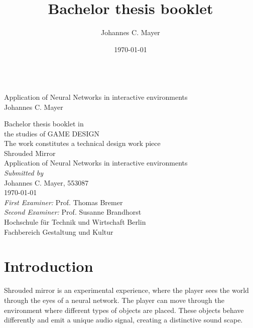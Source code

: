 \documentclass[a4paper, twoside, 10pt]{report}
\title{Bachelor thesis booklet}
\author{Johannes C. Mayer}
\date{\today}
\newcommand\blankpage{\null\thispagestyle{empty}\addtocounter{page}{-1}\newpage}
\begin{document}
\begin{titlepage}
\vfill
\noindent
{\color{white}{\Huge Shrouded Mirror} \\
{\Large Application of Neural Networks in interactive environments \\
Johannes C. Mayer}}
\vfill

\pagecolor{black}
\afterpage{\nopagecolor}
\end{titlepage}

\blankpage
\pagestyle{plain}

\begin{center}
\begin{spacing}{1.5}
{\Large
Bachelor thesis booklet in \\ the studies of GAME DESIGN \\
\vspace*{\fill}
The work constitutes a technical design work piece \\
\vspace*{\fill}
{\huge Shrouded Mirror} \\
Application of Neural Networks in interactive environments \\
\vspace*{\fill}
\textit{Submitted by} \\
Johannes C. Mayer, 553087 \\
\today \\
\vspace*{\fill}
\textit{First Examiner:} Prof. Thomas Bremer \\
\textit{Second Examiner:} Prof. Susanne Brandhorst \\
\vspace*{\fill}
Hochschule f\"ur Technik und Wirtschaft Berlin \\
Fachbereich Gestaltung und Kultur \\
}
\end{spacing}
\end{center}

\newpage

\tableofcontents
\cleardoublepage
\newpage
{}

\chapter{Introduction}
Shrouded mirror is an experimental experience, where the player sees the world through the eyes of a neural network. The player can move through the environment where different types of objects are placed. These objects behave differently and emit a unique audio signal, creating a distinctive sound scape.
\end{document}
